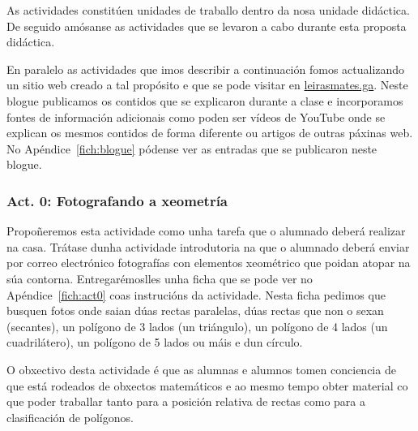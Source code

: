 As actividades constitúen unidades de traballo dentro da nosa unidade didáctica. De seguido amósanse as actividades que se levaron a cabo durante esta proposta didáctica.

En paralelo as actividades que imos describir a continuación fomos actualizando un sitio web creado a tal propósito e que se pode visitar en \href{http://leirasmates.ga}{leirasmates.ga}. Neste blogue publicamos os contidos que se explicaron durante a clase e incorporamos fontes de información adicionais como poden ser vídeos de YouTube onde se explican os mesmos contidos de forma diferente ou artigos de outras páxinas web. No Apéndice~\ref{fich:blogue} pódense ver as entradas que se publicaron neste blogue.

\subsubsection{Act. 0: Fotografando a xeometría}\label{act0}

Propoñeremos esta actividade como unha tarefa que o alumnado deberá realizar na casa. Trátase dunha actividade introdutoria na que o alumnado deberá enviar por correo electrónico fotografías con elementos xeométrico que poidan atopar na súa contorna. Entregarémoslles unha ficha que se pode ver no  Apéndice~\ref{fich:act0} coas instrucións da actividade. Nesta ficha pedimos que busquen fotos onde saian dúas rectas paralelas, dúas rectas que non o sexan (secantes), un polígono de 3 lados (un triángulo), un polígono de 4 lados (un cuadrilátero), un polígono de 5 lados ou máis e dun círculo.

O obxectivo desta actividade é que as alumnas e alumnos tomen conciencia de que está rodeados de obxectos matemáticos e ao mesmo tempo obter material co que poder traballar tanto para a posición relativa de rectas como para a clasificación de polígonos.

